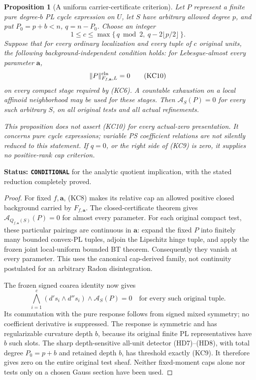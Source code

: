 \documentclass[11pt,a4paper]{article}
\numberwithin{equation}{section}
\newtheorem{proposition}[theorem]{Proposition}
\theoremstyle{definition}
\theoremstyle{remark}
\begin{document}
\begin{proposition}[A uniform carrier-certificate criterion]
\label{prop:r12-carrier-certificate-pure-cycle-quotient}
Let \(P\) represent a finite pure degree-\(b\) PL cycle expression
on \(U\), let \(S\) have arbitrary allowed degree \(p\), and put
\(P_0=p+b<n\), \(q=n-P_0\). Choose an integer
\[
       1\le c\le
       \max\{\,q\bmod2,\ q-2\lfloor p/2\rfloor\,\}.
 \tag{KC9}
\]
Suppose that for every ordinary localization and every tuple of
\(c\) original units, the following background-independent
condition holds: for Lebesgue-almost every parameter \(\mathbf a\),
\[
                      \|P\|^{\rm cln}_{F_{f,\mathbf a},L}=0
 \tag{KC10}
\]
on every compact stage required by (KC6). A countable exhaustion
on a local affinoid neighborhood may be used for these stages.
Then \(\mathcal A_S(P)=0\) for every such arbitrary \(S\), on
all original tests and all actual refinements.

This proposition does not assert (KC10) for every actual-zero
presentation. It concerns pure cycle expressions; variable PS
coefficient relations are not silently reduced to this statement.
If \(q=0\), or the right side of (KC9) is zero, it supplies no
positive-rank cap criterion.
\end{proposition}

\noindent\textbf{Status: \texttt{CONDITIONAL}} for the analytic
quotient implication, with the stated reduction completely proved.

\begin{proof}
For fixed \(f,\mathbf a\), (KC8) makes its relative cap an allowed
positive closed background carried by \(F_{f,\mathbf a}\).
The closed-certificate theorem gives
\(\mathcal A_{Q_{f,\mathbf a}(S)}(P)=0\) for almost every parameter.
For each original compact test, these particular pairings are
continuous in \(\mathbf a\): expand the fixed \(P\) into finitely
many bounded convex-PL tuples, adjoin the Lipschitz hinge tuple,
and apply the frozen joint local-uniform bounded BT theorem.
Consequently they vanish at every parameter. This uses the
canonical cap-derived family, not continuity postulated for an
arbitrary Radon disintegration.

The frozen signed coarea identity now gives
\[
       \bigwedge_{i=1}^c(d's_i\wedge d''s_i)
                         \wedge\mathcal A_S(P)=0
                         \quad\text{for every such original tuple}.
 \tag{KC11}
\]
Its commutation with the pure response follows from signed mixed
symmetry; no coefficient derivative is suppressed. The response
is symmetric and has regularizable curvature depth \(b\), because
its original finite PL representatives have \(b\) such slots.
The sharp depth-sensitive all-unit detector (HD7)--(HD8), with
total degree \(P_0=p+b\) and retained depth \(b\), has threshold
exactly (KC9). It therefore gives zero on the entire original
test sheaf. Neither fixed-moment caps alone nor tests only on a
chosen Gauss section have been used.
\end{proof}
\end{document}
